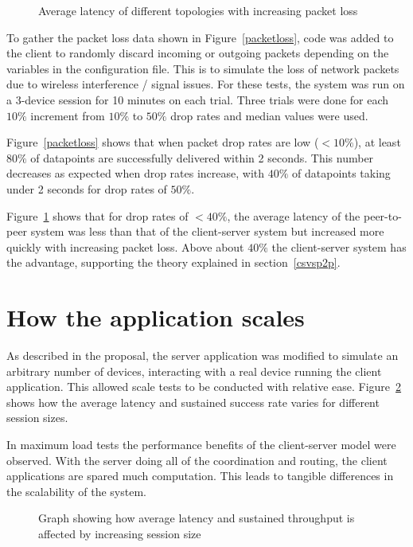 \begin{figure}[H]
\centering

\caption{Average latency of different topologies with increasing packet loss}
\label{packetlossline}
\end{figure}

To gather the packet loss data shown in Figure~\ref{packetloss}, code was added to the client to randomly discard incoming or outgoing packets depending on the variables in the configuration file. This is to simulate the loss of network packets due to wireless interference / signal issues. For these tests, the system was run on a 3-device session for 10 minutes on each trial. Three trials were done for each $10\%$ increment from $10\%$ to $50\%$ drop rates and median values were used.

Figure~\ref{packetloss} shows that when packet drop rates are low ($<10\%$), at least $80\%$ of datapoints are successfully delivered within 2 seconds. This number decreases as expected when drop rates increase, with $40\%$ of datapoints taking under 2 seconds for drop rates of $50\%$. 

Figure~\ref{packetlossline} shows that for drop rates of $<40\%$, the average latency of the peer-to-peer system was less than that of the client-server system but increased more quickly with increasing packet loss. Above about $40\%$ the client-server system has the advantage, supporting the theory explained in section~\ref{csvsp2p}.

\section{How the application scales}
\label{scaling}
As described in the proposal, the server application was modified to simulate an arbitrary number of devices, interacting with a real device running the client application. This allowed scale tests to be conducted with relative ease. Figure~\ref{fig:scale} shows how the average latency and sustained success rate varies for different session sizes.

In maximum load tests the performance benefits of the client-server model were observed. With the server doing all of the coordination and routing, the client applications are spared much computation. This leads to tangible differences in the scalability of the system.

\begin{figure}[h]
\centering

\caption{Graph showing how average latency and sustained throughput is affected by increasing session size}
\label{fig:scale}
\end{figure}

